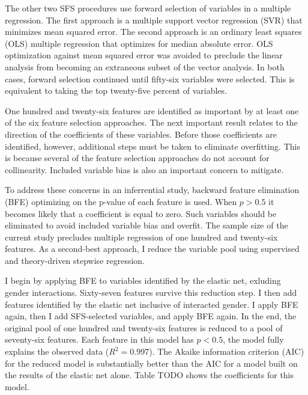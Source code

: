 \documentclass[review]{elsarticle}
\begin{document}
The other two SFS procedures use forward selection of variables in a multiple regression.
The first approach is a multiple support vector regression (SVR) that minimizes mean squared error.
The second approach is an ordinary least squares (OLS) multiple regression that optimizes for median absolute error.
OLS optimization against mean squared error was avoided to preclude the linear analysis from becoming an extraneous subset of the vector analysis.
In both cases, forward selection continued until fifty-six variables were selected.
This is equivalent to taking the top twenty-five percent of variables.

One hundred and twenty-six features are identified as important by at least one of the six feature selection approaches.
The next important result relates to the direction of the coefficients of these variables.
Before those coefficients are identified, however, additional steps must be taken to eliminate overfitting.
This is because several of the feature selection approaches do not account for collinearity.
Included variable bias is also an important concern to mitigate.

To address these concerns in an inferrential study, backward feature elimination (BFE) optimizing on the p-value of each feature is used.
When $p > 0.5$ it becomes likely that a coefficient is equal to zero.
Such variables should be eliminated to avoid included variable bias and overfit.
The sample size of the current study precludes multiple regression of one hundred and twenty-six features.
As a second-best approach, I reduce the variable pool using supervised and theory-driven stepwise regression.

I begin by applying BFE to variables identified by the elastic net, exluding gender interactions.
Sixty-seven features survive this reduction step.
I then add features identified by the elastic net inclusive of interacted gender.
I apply BFE again, then I add SFS-selected variables, and apply BFE again.
In the end, the original pool of one hundred and twenty-six features is reduced to a pool of seventy-six features.
Each feature in this model has $p < 0.5$,
the model fully explains the observed data ($R^2 = 0.997$).
The Akaike information criterion (AIC) for the reduced model is substantially better than the AIC for a model built on the results of the elastic net alone.
Table TODO shows the coefficients for this model.
\end{document}
